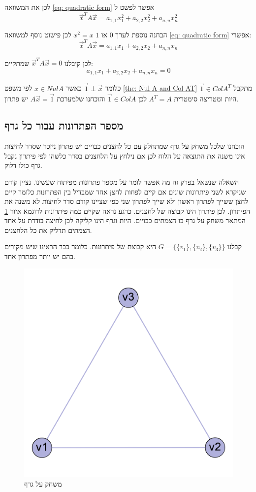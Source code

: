 \documentclass[12pt,twoside]{article}
\begin{document}
לכן
את המשוואה 
\ref{eq: quadratic form}
אפשר לפשט ל
\[ \vec{x}^T A \vec{x} = a_{1,1}x_1^2 + a_{2,2} x_2^2 +  a_{n,n} x_n^2\]

הבחנה נוספת לערך 
$0$
או
$1$
$x^2 = x$
לכן פישוט נוסף למשוואה 
\ref{eq: quadratic form}
אפשרי:
\[ \vec{x}^T A \vec{x} = a_{1,1}x_1 + a_{2,2} x_2 +  a_{n,n} x_n\]

לכן קיבלנו 
$ \vec{x}^T A \vec{x} = 0$
שמתקיים:
\[a_{1,1}x_1 + a_{2,2} x_2 +  a_{n,n} x_n = 0\]

כלומר 
$\vec{1} \perp  \vec{x}$
כאשר 
$x \in Nul A$
לפי משפט 
\ref{the: Nul A and Col AT}
מתקבל 
$\vec{1} \in Col A^T$
היות ומטריצה סימטרית 
$A^T = A$
לכן
$\vec{1} \in Col A$
והוכחנו שלמערכת
$A\vec{x} = \vec{1}$
יש פתרון.

\subsection{מספר הפתרונות עבור כל גרף}

הוכחנו שלכל משחק על גרף שמתחלק עם כל לחצנים כבויים יש פתרון ניזכר שסדר לחיצות
אינו משנה את התוצאה על הלוח לכן אם נילחץ על הלחצנים בסדר כלשהו 
לפי פיתרון נקבל גרף כולו דלוק.

השאלה  שנשאל בפרק זה מה אפשר לומר על מספר פתרונות מפיתוח שעשינו.
נציין קודם שניקרא לשני פיתרונות שונים אם קיים לפחות לחצן אחד שמבדיל בין הפתרונות 
כלומר קיים לחצן ששייך לפתרון ראשון ולא שייך לפתרון שני כפי שציינו קודם סדר
לחיצות לא משנה את הפיתרון.
לכן פיתרון הינו קבוצה של לחצנים.
כרגע נראה שקיים כמה פיתרונות לדוגמא 
איור
\ref{fig: clic 3 node graph game}
המתאר משחק על גרף בו הצמתים כבויים.
היות וגרף הינו קליקה לכן לחיצה בודדת על אחד הצמתים תדליק את כל הלחצנים.

קבלנו 
$G = \{\{v_1\}, \{v_2\}, \{v_3\} \}$
היא קבוצת של פיתרונות.
כלומר כבר הראינו שיש מקירים בהם יש יותר מפתרון אחד.


\begin{figure}[ht]
    \caption{משחק על גרף}
    \label{fig: clic 3 node graph game} 
    \unsethebrew
    \centering
    \includegraphics[width=.5\textwidth,height=.5\textheight,keepaspectratio]{images/clic_graph_3_node.png}
\end{figure}
\sethebrew
\end{document}
